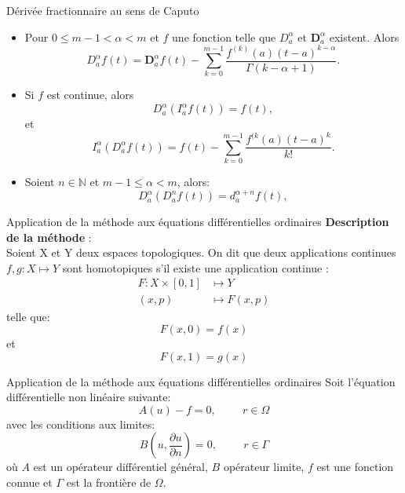 \documentclass{sintefbeamer}
\begin{document}
\begin{frame}{Dérivée fractionnaire au sens de Caputo}
    \begin{itemize}

\item Pour $0\leq m-1<\alpha<m$ et $f$ une fonction telle que $D_a^{\alpha}$ et $\textbf{D}_a^{\alpha}$ existent. Alors 
\begin{equation}
    D_a^{\alpha} f(t) = \textbf{D}_a^{\alpha}f(t) -\sum_{k=0}^{m-1} \frac{f^{(k)}(a)(t-a)^{k-\alpha}}{\Gamma(k-\alpha+1)}.
\end{equation}
    \item Si $f$ est continue, alors
\begin{equation*}
    D_a^{\alpha}(I_a^{\alpha} f(t))=f(t),
\end{equation*}
et \begin{equation*}
    I_a^{\alpha}\left(D_a^{\alpha} f(t) \right)=f(t)-\sum_{k=0}^{m-1} \frac{f^{(k}(a)(t-a)^k}{k!}.
\end{equation*}
\item Soient $n\in\mathbb{N}$ et $m-1\leq\alpha<m$, alors:
\begin{equation}\label{eq:comp_o_n}
    D_a^{\alpha}(D_a^n f(t)) = d_a^{\alpha+n}f(t),
\end{equation}
    \end{itemize}
\end{frame}



\begin{frame}{Application de la méthode aux équations différentielles ordinaires}
    \textbf{Description de la méthode} :\\
Soient X et Y deux espaces topologiques. On dit que deux applications continues $f,g:X\mapsto Y$ sont homotopiques s'il existe une application continue :
\begin{align*}
    F:X \times [0,1] & \mapsto Y \\
    (x,p) &\mapsto F(x,p)
\end{align*}
telle que:
\begin{equation*}
    F(x,0)=f(x)
\end{equation*}
et
\begin{equation*}
    F(x,1) = g(x)
\end{equation*}
\end{frame}

\begin{frame}{Application de la méthode aux équations différentielles ordinaires}
    Soit l'équation différentielle non linéaire suivante:
\begin{equation} \label{eq:def_ED}
    A(u)-f=0, \hspace{1cm} r\in\Omega
\end{equation}
avec les conditions aux limites:
\begin{equation}
    B(u,\frac{\partial u}{\partial n}) = 0, \hspace{1cm} r\in \Gamma
\end{equation}
où $A$ est un opérateur différentiel général, $B$ opérateur limite, $f$ est une fonction connue et $\Gamma$ est la frontière de $\Omega$.\\
\end{frame}
\end{document}

